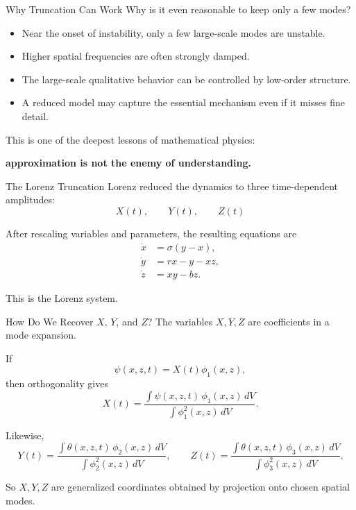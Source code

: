 \documentclass[aspectratio=169]{beamer}
\begin{document}
\begin{frame}{Why Truncation Can Work}
Why is it even reasonable to keep only a few modes?
\begin{itemize}
\item Near the onset of instability, only a few large-scale modes are unstable.
\item Higher spatial frequencies are often strongly damped.
\item The large-scale qualitative behavior can be controlled by low-order structure.
\item A reduced model may capture the essential mechanism even if it misses fine detail.
\end{itemize}

This is one of the deepest lessons of mathematical physics:
\begin{center}
\large
\textbf{approximation is not the enemy of understanding.}
\end{center}
\end{frame}

\begin{frame}{The Lorenz Truncation}
Lorenz reduced the dynamics to three time-dependent amplitudes:
\begin{equation*}
X(t), \qquad Y(t), \qquad Z(t)
\end{equation*}

After rescaling variables and parameters, the resulting equations are
\begin{align*}
\dot{x} &= \sigma(y-x), \\
\dot{y} &= rx-y-xz, \\
\dot{z} &= xy-bz.
\end{align*}

This is the Lorenz system.
\end{frame}

\begin{frame}{How Do We Recover $X$, $Y$, and $Z$?}
The variables $X,Y,Z$ are coefficients in a mode expansion.

If
\begin{equation*}
\psi(x,z,t)=X(t)\phi_1(x,z),
\end{equation*}
then orthogonality gives
\begin{equation*}
X(t)=
\frac{\int \psi(x,z,t)\,\phi_1(x,z)\,dV}
{\int \phi_1^2(x,z)\,dV}.
\end{equation*}

Likewise,
\begin{equation*}
Y(t)=
\frac{\int \theta(x,z,t)\,\phi_2(x,z)\,dV}
{\int \phi_2^2(x,z)\,dV},
\qquad
Z(t)=
\frac{\int \theta(x,z,t)\,\phi_3(x,z)\,dV}
{\int \phi_3^2(x,z)\,dV}.
\end{equation*}

So $X,Y,Z$ are generalized coordinates obtained by projection onto chosen spatial modes.
\end{frame}
\end{document}
